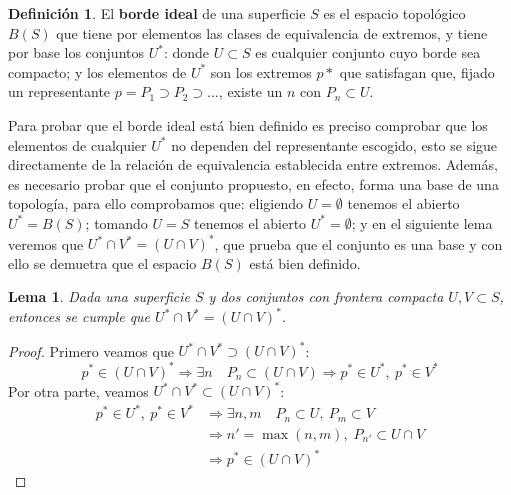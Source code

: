 \documentclass[a4paper,11pt,spanish, twoside, leqno]{tfg-uam}
\newtheorem{lema}[teor]{Lema}
\theoremstyle{definition}
\newtheorem{defin}[teor]{Definici\'on}
\begin{document}
\begin{defin}
El \textbf{borde ideal} de una superficie $S$ es el espacio topológico $B(S)$ que tiene por elementos las clases de equivalencia de extremos, y tiene por base los conjuntos $U^*$: donde $U\subset S$ es cualquier conjunto  cuyo borde sea compacto; y los elementos de $U^*$ son los extremos $p*$ que satisfagan que, fijado un representante $p=P_1 \supset P_2 \supset \ldots $, existe un $n$ con $P_n \subset U$.
\end{defin}
Para probar que el borde ideal está bien definido es preciso comprobar que los elementos de cualquier $U^*$ no dependen del representante escogido, esto se sigue directamente de la relación de equivalencia establecida entre extremos. Además, es necesario probar que el conjunto propuesto, en efecto, forma una base de una topología, para ello comprobamos que: eligiendo $U=\emptyset$ tenemos el abierto $U^*=B(S)$; tomando $U = S$ tenemos el abierto $U^*=\emptyset$; y en el siguiente lema veremos que $U^* \cap V^* = (U \cap V)^*$, que prueba que el conjunto es una base y con ello se demuetra que el espacio $B(S)$ está bien definido.

\begin{lema}
\label{lema:intdeextremos}
Dada una superficie $S$ y dos conjuntos  con frontera compacta $U,V \subset S$, entonces se cumple que $U^*\cap V^* = (U \cap V)^* $.
\end{lema}
\begin{proof}
Primero veamos que $U^*\cap V^* \supset (U \cap V)^* $:
\[
p^* \in (U \cap V)^* \Rightarrow
\exists n \quad P_n \subset (U \cap V) \Rightarrow
p^* \in U^*, \: p^* \in V^*
\]
Por otra parte, veamos $U^*\cap V^* \subset (U \cap V)^* $:
\begin{align*}
p^* \in U^*, \: p^* \in V^* & \Rightarrow \exists n,m \quad P_n \subset U, \: P_m \subset V\\
& \Rightarrow n' = \max(n,m), \; P_{n'} \subset U \cap V\\
& \Rightarrow p^* \in (U\cap V)^*
\end{align*}
\end{proof}
\end{document}
